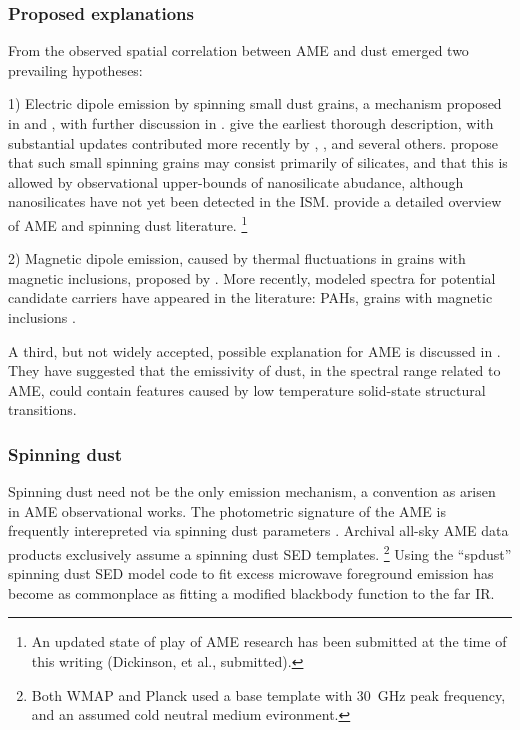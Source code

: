   \subsubsection{Proposed explanations}

     From the observed spatial correlation between AME and dust emerged two prevailing hypotheses:

    1) Electric dipole emission by spinning small dust grains, a mechanism proposed in \cite{erickson57} and \cite{hoyle70}, with further discussion in \cite{ferrara94}. \cite{draine98b} give the earliest thorough description, with substantial updates contributed more recently by \cite{ysard10a}, \cite{ali-haimoud09}, \cite{hoang10} and several others. \cite{hensley17a} propose that such small spinning grains may consist primarily of silicates, and that this is allowed by observational upper-bounds of nanosilicate abudance, although nanosilicates have not yet been detected in the ISM. \cite{dickinson13r} provide a detailed overview of AME and spinning dust literature. \footnote{An updated state of play of AME research has been submitted at the time of this writing (Dickinson, et al., submitted).}

    2) Magnetic dipole emission, caused by thermal fluctuations in grains with magnetic inclusions, proposed by \cite{draine99}.
     More recently, modeled spectra for potential candidate carriers have appeared in the literature: PAHs, grains with magnetic inclusions \citep{draine13, ali-haimoud14, hoang16a}.

    A third, but not widely accepted, possible explanation for AME is discussed in \cite{jones09}. They have suggested that the emissivity of dust, in the spectral range related to AME, could contain features caused by low temperature solid-state structural transitions.

    \subsubsection{Spinning dust}
     Spinning dust need not be the only emission mechanism, a convention as arisen in AME observational works. The photometric signature of the AME is frequently interepreted via spinning dust parameters \citep{ysard11,ali-haimoud10}. Archival all-sky AME data products exclusively assume a spinning dust SED templates.   \footnote{Both WMAP and Planck used a base template with 30~GHz peak frequency, and an assumed cold neutral medium evironment.} Using the ``spdust'' spinning dust SED model code to fit excess microwave foreground emission has become as commonplace as fitting a modified blackbody function to the far IR.

